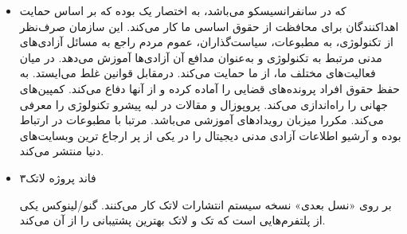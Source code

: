 \begin{itemize}
\item
{}

که در سانفرانسیسکو می‌باشد، به اختصار  یک
بوده که بر اساس حمایت اهداکنندگان برای محافظت از حقوق
اساسی ما کار می‌کند. این سازمان صرف‌نظر از تکنولوژی، به
مطبوعات، سیاست‌گذاران، عموم مردم راجع به مسائل آزادی‌های مدنی
مرتبط به تکنولوژی و به‌عنوان مدافع آن آزادی‌ها آموزش می‌دهد.
در میان فعالیت‌های مختلف ما،  از ما حمایت می‌کند.
درمقابل قوانین غلط می‌ایستد. به حفظ حقوق افراد پرونده‌های
قضایی را آماده کرده و از آنها دفاع می‌کند. کمپین‌های جهانی
را راه‌اندازی می‌کند. پروپوزال و مقالات در لبه پیشرو تکنولوژی
را معرفی می‌کند. مکررا میزبان رویدادهای آموزشی می‌باشد.
مرتبا با مطبوعات در ارتباط بوده و آرشیو اطلاعات آزادی مدنی
دیجیتال را در یکی از پر ارجاع ترین وبسایت‌های دنیا منتشر می‌کند.







\item
فاند پروژه لاتک۳

بر روی «نسل بعدی» نسخه سیستم انتشارات لاتک کار می‌کنند. گنو/لینوکس
یکی از پلتفرم‌هایی است که تک و لاتک بهترین پشتیبانی را از آن می‌کند.





\end{itemize}
